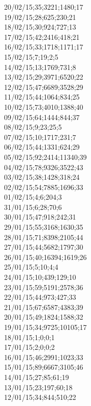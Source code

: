 20/02/15;35;3221;1480;17 \\
19/02/15;28;625;230;21 \\
18/02/15;30;924;727;13 \\
17/02/15;42;2416;418;21 \\
16/02/15;33;1718;1171;17 \\
15/02/15;7;19;2;5 \\
14/02/15;13;1769;731;8 \\
13/02/15;29;3971;6520;22 \\
12/02/15;47;6689;3528;29 \\
11/02/15;44;1064;834;25 \\
10/02/15;73;4010;1388;40 \\
09/02/15;64;1444;844;37 \\
08/02/15;9;23;25;5 \\
07/02/15;10;1717;231;7 \\
06/02/15;44;1331;624;29 \\
05/02/15;92;2414;11340;39 \\
04/02/15;78;9326;3522;43 \\
03/02/15;38;1428;318;24 \\
02/02/15;54;7885;1696;33 \\
01/02/15;4;6;204;3 \\
31/01/15;6;28;70;6 \\
30/01/15;47;918;242;31 \\
29/01/15;55;3168;1630;35 \\
28/01/15;71;8398;2105;44 \\
27/01/15;44;5682;1797;30 \\
26/01/15;40;16394;1619;26 \\
25/01/15;5;10;4;4 \\
24/01/15;10;439;129;10 \\
23/01/15;59;5191;2578;36 \\
22/01/15;44;973;427;33 \\
21/01/15;67;6587;4383;39 \\
20/01/15;49;1824;1588;32 \\
19/01/15;34;9725;10105;17 \\
18/01/15;1;0;0;1 \\
17/01/15;2;0;0;2 \\
16/01/15;46;2991;1023;33 \\
15/01/15;89;6667;3105;46 \\
14/01/15;27;85;61;19 \\
13/01/15;23;197;60;18 \\
12/01/15;34;844;510;22 \\
